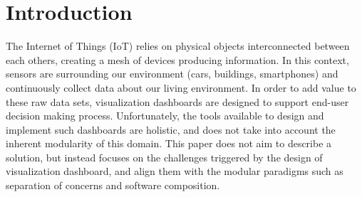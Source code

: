 \documentclass{acm_proc_article-sp}
\begin{document}
\section{Introduction}

The Internet of Things (IoT) relies on physical objects interconnected
between each others, creating a mesh of devices producing
information. In this context, sensors are surrounding our environment
(\eg cars, buildings, smartphones) and continuously collect data about
our living environment. In order to add value to these raw data sets,
visualization dashboards are designed to support end-user decision
making process. Unfortunately, the tools available to design and
implement such dashboards are holistic, and does not take into account
the inherent modularity of this domain. This paper does not aim to
describe a solution, but instead focuses on the challenges triggered
by the design of visualization dashboard, and align them with the
modular paradigms such as separation of concerns and software
composition.

\end{document}
